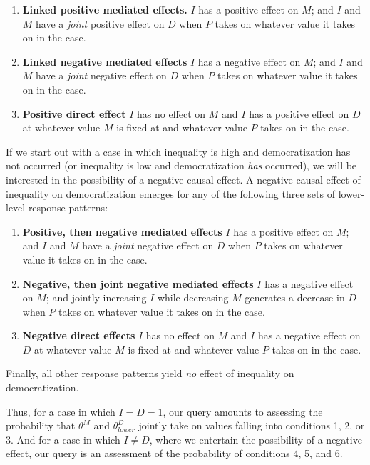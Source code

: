 \documentclass[
  12pt,
]{book}
\begin{document}
\begin{enumerate}
\def\labelenumi{\arabic{enumi}.}
\item
  \textbf{Linked positive mediated effects.} \(I\) has a positive effect on \(M\); and \(I\) and \(M\) have a \emph{joint} positive effect on \(D\) when \(P\) takes on whatever value it takes on in the case.
\item
  \textbf{Linked negative mediated effects} \(I\) has a negative effect on \(M\); and \(I\) and \(M\) have a \emph{joint} negative effect on \(D\) when \(P\) takes on whatever value it takes on in the case.
\item
  \textbf{Positive direct effect} \(I\) has no effect on \(M\) and \(I\) has a positive effect on \(D\) at whatever value \(M\) is fixed at and whatever value \(P\) takes on in the case.
\end{enumerate}

If we start out with a case in which inequality is high and democratization has not occurred (or inequality is low and democratization \emph{has} occurred), we will be interested in the possibility of a negative causal effect. A negative causal effect of inequality on democratization emerges for any of the following three sets of lower-level response patterns:

\begin{enumerate}
\def\labelenumi{\arabic{enumi}.}
\setcounter{enumi}{3}
\item
  \textbf{Positive, then negative mediated effects} \(I\) has a positive effect on \(M\); and \(I\) and \(M\) have a \emph{joint} negative effect on \(D\) when \(P\) takes on whatever value it takes on in the case.
\item
  \textbf{Negative, then joint negative mediated effects} \(I\) has a negative effect on \(M\); and jointly increasing \(I\) while decreasing \(M\) generates a decrease in \(D\) when \(P\) takes on whatever value it takes on in the case.
\item
  \textbf{Negative direct effects} \(I\) has no effect on \(M\) and \(I\) has a negative effect on \(D\) at whatever value \(M\) is fixed at and whatever value \(P\) takes on in the case.
\end{enumerate}

Finally, all other response patterns yield \emph{no} effect of inequality on democratization.

Thus, for a case in which \(I=D=1\), our query amounts to assessing the probability that \(\theta^M\) and \(\theta^D_{lower}\) jointly take on values falling into conditions 1, 2, or 3. And for a case in which \(I \neq D\), where we entertain the possibility of a negative effect, our query is an assessment of the probability of conditions 4, 5, and 6.
\end{document}
